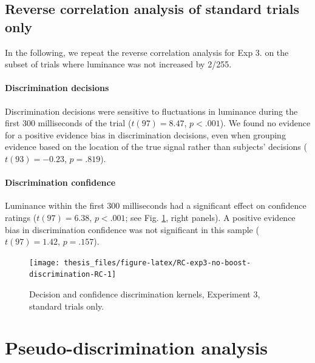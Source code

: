\documentclass[12pt,twoside]{reedthesis}
\begin{document}
\hypertarget{appRC-standardonly}{%
\subsection{Reverse correlation analysis of standard trials only}\label{appRC-standardonly}}

In the following, we repeat the reverse correlation analysis for Exp 3. on the subset of trials where luminance was not increased by 2/255.

\hypertarget{discrimination-decisions-2}{%
\paragraph*{Discrimination decisions}\label{discrimination-decisions-2}}

Discrimination decisions were sensitive to fluctuations in luminance during the first 300 milliseconds of the trial (\(t(97) = 8.47\), \(p < .001\)). We found no evidence for a positive evidence bias in discrimination decisions, even when grouping evidence based on the location of the true signal rather than subjects' decisions (\(t(93) = -0.23\), \(p = .819\)).

\hypertarget{discrimination-confidence-2}{%
\paragraph*{Discrimination confidence}\label{discrimination-confidence-2}}

Luminance within the first 300 milliseconds had a significant effect on confidence ratings (\(t(97) = 6.38\), \(p < .001\); see Fig. \ref{fig:RC-exp3-no-boost-discrimination-RC}, right panels). A positive evidence bias in discrimination confidence was not significant in this sample (\(t(97) = 1.42\), \(p = .157\)).


\begin{figure}
\texttt{[image: thesis\_files/figure-latex/RC-exp3-no-boost-discrimination-RC-1]} \caption[Decision kernels in discrimination, Exp. 3]{Decision and confidence discrimination kernels, Experiment 3, standard trials only.}\label{fig:RC-exp3-no-boost-discrimination-RC}
\end{figure}
\hypertarget{appRC-PDRC}{%
\section{Pseudo-discrimination analysis}\label{appRC-PDRC}}
\end{document}
